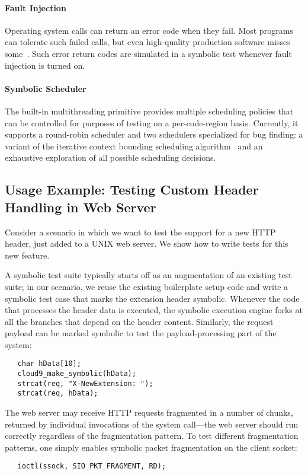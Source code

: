 \paragraph{Fault Injection}

Operating system calls can return an error code when they fail.
%
Most programs can tolerate such failed calls, but even high-quality production software misses some~\cite{lfi}. Such error return codes are simulated in a symbolic test whenever fault injection is turned on. 

\paragraph{Symbolic Scheduler}

The built-in multithreading primitive provides multiple scheduling policies that can be controlled for purposes of testing on a per-code-region basis.
%
Currently, it supports a round-robin scheduler and two schedulers specialized for bug finding: a variant of the iterative context bounding scheduling algorithm~\cite{chess} and an exhaustive exploration of all possible scheduling decisions.  


\subsection{Usage Example: Testing Custom Header Handling in Web Server}

Consider a scenario in which we want to test the support for a new  HTTP header, just added to a UNIX web server.
%
We show how to write tests for this new feature.

A symbolic test suite typically starts off as an augmentation of an existing test suite;
%
in our scenario, we reuse the existing boilerplate setup code and write a symbolic test case that marks the extension header symbolic. Whenever the code that processes the header data is executed, the symbolic execution engine forks at all the branches that depend on the header content. Similarly, the request payload can be marked symbolic to test the payload-processing part of the system:

\begin{verbatim}
   char hData[10];
   cloud9_make_symbolic(hData);
   strcat(req, "X-NewExtension: ");
   strcat(req, hData);
\end{verbatim}

The web server may receive HTTP requests fragmented in a number of chunks, returned by individual invocations of the  system call---the web server should run correctly regardless of the fragmentation pattern.
%
To test different fragmentation patterns, one simply enables symbolic packet fragmentation on the client socket:
\begin{verbatim}
   ioctl(ssock, SIO_PKT_FRAGMENT, RD);
\end{verbatim}

